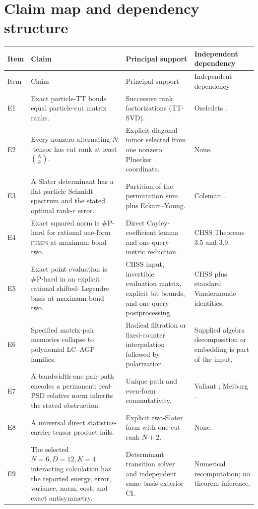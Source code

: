 \documentclass[11pt]{article}
\theoremstyle{definition}
\newcommand{\FEMPS}{\textnormal{\textsc{femps}}}
\begin{document}
\section{Claim map and dependency structure}

\begin{longtable}{@{}P{15mm}P{45mm}P{50mm}P{30mm}@{}}
\toprule
Item & Claim & Principal support & Independent dependency \\
\midrule
\endfirsthead
\toprule
Item & Claim & Principal support & Independent dependency \\
\midrule
\endhead
E1 & Exact particle-TT bonds equal particle-cut matrix ranks. & Successive
rank factorizations (TT-SVD). & Oseledets \cite{Oseledets2011TT}. \\
E2 & Every nonzero alternating $N$-tensor has cut rank at least
$\binom Nk$. & Explicit diagonal minor selected from one nonzero Pluecker
coordinate. & None. \\
E3 & A Slater determinant has a flat particle Schmidt spectrum and the stated
optimal rank-$r$ error. & Partition of the permutation sum plus
Eckart--Young. & Coleman \cite{Coleman1963FermionRDM}. \\
E4 & Exact squared norm is \#P-hard for rational one-form \FEMPS{} at maximum
bond two. & Direct Cayley-coefficient lemma and one-query metric reduction. &
CHSS Theorems 3.5 and 3.9. \\
E5 & Exact point evaluation is \#P-hard in an explicit rational shifted-
Legendre basis at maximum bond two. & CHSS input, invertible evaluation
matrix, explicit bit bounds, and one-query postprocessing. & CHSS plus standard
Vandermonde identities. \\
E6 & Specified matrix-pair memories collapse to polynomial LC--AGP families. &
Radical filtration or fixed-counter interpolation followed by polarization. &
Supplied algebra decomposition or embedding is part of the input. \\
E7 & A bandwidth-one pair path encodes a permanent; real-PSD relative norm
inherits the stated obstruction. & Unique path and even-form commutativity. &
Valiant \cite{Valiant1979Permanent}; Meiburg \cite{Meiburg2023PSDPermanent}. \\
E8 & A universal direct statistics-carrier tensor product fails. & Explicit
two-Slater form with one-cut rank $N+2$. & None. \\
E9 & The selected $N=6,D=12,K=4$ interacting calculation has the reported
energy, error, variance, norm, cost, and exact antisymmetry. & Determinant
transition solver and independent same-basis exterior CI. & Numerical
recomputation; no theorem inference. \\
\bottomrule
\end{longtable}
\end{document}
